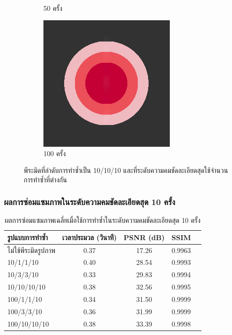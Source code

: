 \documentclass[xcolor=dvipsnames, xetex,serif]{beamer}
\numberwithin{equation}{section}
\begin{document}
\begin{frame}
\begin{figure}[H]
\begin{subfigure}{0.4\linewidth}
                \caption{50 ครั้ง}
            \end{subfigure}
            \begin{subfigure}{0.4\linewidth}
                \centering
                \includegraphics[width=0.6\linewidth]{images/just10enough/only100time.png}			
                \caption{100 ครั้ง}
            \end{subfigure}
            \caption{{\footnotesize พีระมิดที่ลำดับการทำซ้ำเป็น 10/10/10 และที่ระดับความคมชัดละเอียดสุดใช้จำนวนการทำซ้ำที่ต่างกัน}}
        \end{figure}
    \end{frame}
    \begin{frame}
        \frametitle{ผลการซ่อมแซมภาพในระดับความคมชัดละเอียดสุด 10 ครั้ง}
        \begin{table}[H]
            \centering
            \begin{tabular}[ht]{|l|c|c|c|c|}
                \hline
                รูปแบบการทำซ้ำ  & เวลาประมวล  (วินาที) & PSNR (dB) & SSIM \\
                \hline
                ไม่ใช้พีระมิดรูปภาพ & 0.37 & 17.26 & 0.9963  \\
                10/1/1/10 & 0.40 & 28.54 & 0.9993 \\
                10/3/3/10 & 0.33 & 29.83  & 0.9994 \\
                10/10/10/10 & 0.38 & 32.56 & 0.9995 \\
                100/1/1/10 & 0.34 & 31.50 & 0.9999 \\
                100/3/3/10 & 0.36 & 31.99 & 0.9999 \\
                100/10/10/10 & 0.38 & 33.39 & 0.9998 \\
                \hline
            \end{tabular}
            \caption{{\small ผลการซ่อมแซมภาพเฉลี่ยเมื่อใช้การทำซ้ำในระดับความคมชัดละเอียดสุด 10 ครั้ง}}
        \end{table}	
    \end{frame}
\end{document}
